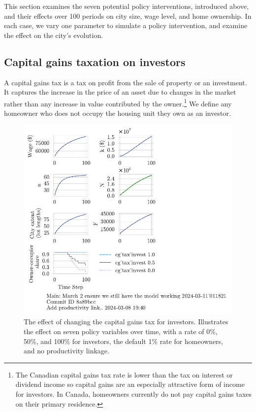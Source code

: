 This section examines the seven potential policy interventions, introduced above, and their effects over 100 periods on city size, wage level, and home ownership. In each case, we vary one parameter to simulate a policy  intervention, %
and examine the effect on the city's evolution.

\subsection{Capital gains taxation on investors}
A \gls{capital gains} tax is a tax on profit from the sale of property or an investment. It captures the increase in the price of an asset due to changes in the market rather than any increase in value contributed by the owner.\footnote{The Canadian capital gains tax rate is lower than the tax on interest or dividend income so capital gains are an especially attractive form of income for investors. In Canada, homeowners currently do not pay capital gains taxes on their primary residence. %
} We define any homeowner who does not occupy the housing unit they own as an investor. 

\begin{figure}[!hbtp]
\centering
\includegraphics[scale=1.1, trim={0 1.4cm 4cm 0},clip]{fig/cg_tax_invest-Main-011821.pdf}
\caption[The effect of changing the capital gains tax for investors]{The effect of changing the capital gains tax for investors. Illustrates the effect on seven policy variables over time, with a rate of 0\%, 50\%, and 100\% for investors, the default 1\% rate for homeowners, and no productivity linkage.}
\label{fig:CGinvest_ownership_trajectory}
\end{figure}


